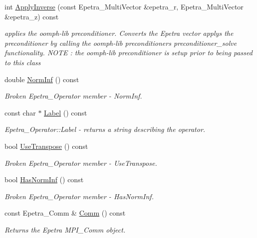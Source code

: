 \begin{DoxyCompactItemize}
int \hyperlink{classoomph_1_1OomphLibPreconditionerEpetraOperator_a6272811acfd9ad5b70e1d30447e0742b}{Apply\+Inverse} (const Epetra\+\_\+\+Multi\+Vector \&epetra\+\_\+r, Epetra\+\_\+\+Multi\+Vector \&epetra\+\_\+z) const
\begin{DoxyCompactList}\small\item\em applies the oomph-\/lib preconditioner. Converts the Epetra vector applys the preconditioner by calling the oomph-\/lib preconditioner\textquotesingle{}s preconditioner\+\_\+solve functionality. N\+O\+TE \+: the oomph-\/lib preconditioner is setup prior to being passed to this class \end{DoxyCompactList}\item 
double \hyperlink{classoomph_1_1OomphLibPreconditionerEpetraOperator_ac08f2645cbfbaf4b566fe4089c8fae22}{Norm\+Inf} () const
\begin{DoxyCompactList}\small\item\em Broken Epetra\+\_\+\+Operator member -\/ Norm\+Inf. \end{DoxyCompactList}\item 
const char $\ast$ \hyperlink{classoomph_1_1OomphLibPreconditionerEpetraOperator_a53e01cbbf1c42a7d8baaf9904545969e}{Label} () const
\begin{DoxyCompactList}\small\item\em Epetra\+\_\+\+Operator\+::\+Label -\/ returns a string describing the operator. \end{DoxyCompactList}\item 
bool \hyperlink{classoomph_1_1OomphLibPreconditionerEpetraOperator_aa70ab70fe3188e78fc623d3240f7af19}{Use\+Transpose} () const
\begin{DoxyCompactList}\small\item\em Broken Epetra\+\_\+\+Operator member -\/ Use\+Transpose. \end{DoxyCompactList}\item 
bool \hyperlink{classoomph_1_1OomphLibPreconditionerEpetraOperator_a584ad443e96d730d6abbcf6291298545}{Has\+Norm\+Inf} () const
\begin{DoxyCompactList}\small\item\em Broken Epetra\+\_\+\+Operator member -\/ Has\+Norm\+Inf. \end{DoxyCompactList}\item 
const Epetra\+\_\+\+Comm \& \hyperlink{classoomph_1_1OomphLibPreconditionerEpetraOperator_ade006ce21f59cf90af05b652eca79308}{Comm} () const
\begin{DoxyCompactList}\small\item\em Returns the Epetra M\+P\+I\+\_\+\+Comm object. \end{DoxyCompactList}\item 

\end{DoxyCompactItemize}
